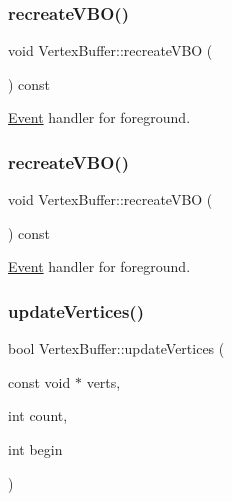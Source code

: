 \subsubsection{\texorpdfstring{recreate\+V\+B\+O()}{recreateVBO()}\hspace{0.1cm}{\footnotesize\ttfamily [1/2]}}
{\footnotesize\ttfamily void Vertex\+Buffer\+::recreate\+V\+BO (\begin{DoxyParamCaption}{ }\end{DoxyParamCaption}) const\hspace{0.3cm}{\ttfamily [protected]}}

\hyperlink{classEvent}{Event} handler for foreground. \mbox{\label{classVertexBuffer_afac40219f059942be1fca86138205dbf}} 
\subsubsection{\texorpdfstring{recreate\+V\+B\+O()}{recreateVBO()}\hspace{0.1cm}{\footnotesize\ttfamily [2/2]}}
{\footnotesize\ttfamily void Vertex\+Buffer\+::recreate\+V\+BO (\begin{DoxyParamCaption}{ }\end{DoxyParamCaption}) const\hspace{0.3cm}{\ttfamily [protected]}}

\hyperlink{classEvent}{Event} handler for foreground. \mbox{\label{classVertexBuffer_a457b7753668e6d83dbd8b69af245bf2e}} 
\subsubsection{\texorpdfstring{update\+Vertices()}{updateVertices()}\hspace{0.1cm}{\footnotesize\ttfamily [1/2]}}
{\footnotesize\ttfamily bool Vertex\+Buffer\+::update\+Vertices (\begin{DoxyParamCaption}\item[{const void $\ast$}]{verts,  }\item[{int}]{count,  }\item[{int}]{begin }\end{DoxyParamCaption})}

